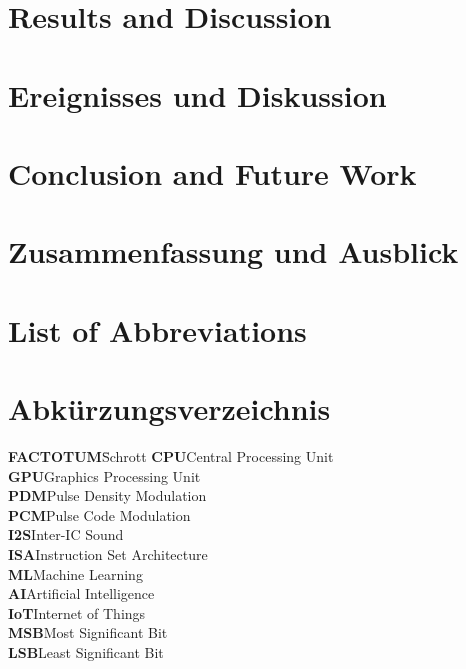 \documentclass[oneside,11pt,a4paper,twoside]{scrreprt}
\begin{document}
\begin{onehalfspace}
	{\chapter{Results and Discussion}}
	{\chapter{Ereignisses und Diskussion}}
\label{cha:results_and_discussion}

\cleardoublepage

	{\chapter{Conclusion and Future Work}}
	{\chapter{Zusammenfassung und Ausblick}}
\label{cha:conclusion_and_future_work}

\cleardoublepage

\end{onehalfspace}
	{\printbibliography[title={References},heading=bibintoc]}
	{\printbibliography[title={Referenzen},heading=bibintoc]}
\cleardoublepage
{
	\chapter*{List of Abbreviations}
}
{
	\chapter*{Abkürzungsverzeichnis}
}
\begin{tabbing}
\textbf{FACTOTUM}\hspace{1cm}\=Schrott\kill
\textbf{CPU}\>Central Processing Unit
\\
\textbf{GPU}\>Graphics Processing Unit
\\
\textbf{PDM}\>Pulse Density Modulation
\\
\textbf{PCM}\>Pulse Code Modulation
\\
\textbf{I2S}\>Inter-IC Sound
\\
\textbf{ISA}\>Instruction Set Architecture
\\
\textbf{ML}\>Machine Learning
\\
\textbf{AI}\>Artificial Intelligence
\\
\textbf{IoT}\>Internet of Things
\\
\textbf{MSB}\>Most Significant Bit
\\
\textbf{LSB}\>Least Significant Bit
\end{tabbing}
\cleardoublepage
\end{document}
